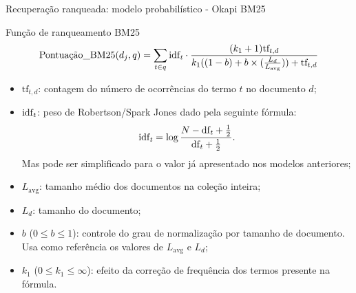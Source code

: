 \documentclass[%
  10pt,%
  aspectratio = 169,%
  compress,%
  t,%
]{beamer}%
\begin{document}
    \begin{frame}[fragile = singleslide]{}{Recuperação ranqueada: modelo probabilístico - Okapi BM25}
        \begin{block}{Função de ranqueamento BM25}
            \begin{equation}
                \label{eq:okapi-bm25}
        		\text{Pontuação\_BM25}(d_j, q) = \sum_{t \in q} \text{idf}_{\text{\textit{t}}}
        		\cdot
        		\frac{(k_1 + 1) \text{tf}_{t,d}}{k_1((1-b)+b \times (\frac{L_d}{L_{\text{avg}}})) + \text{tf}_{t,d}}
            \end{equation}
        \end{block}
        \begin{itemize}
            \item $\text{tf}_{t,d}$: contagem do número de ocorrências do termo $t$ no documento $d$;

            \item $\text{idf}_{\text{\textit{t}}}$: peso de Robertson/Spark Jones dado pela seguinte fórmula:
            \begin{equation}
                \label{eq:peso-rsj-adaptado}
        		\text{idf}_{\text{\textit{t}}} = \log{\frac{N-\text{df}_{\text{\textit{t}}}+\frac{1}{2}}{\text{df}_{\text{\textit{t}}} + \frac{1}{2} }}.
            \end{equation}
            Mas pode ser simplificado para o valor já apresentado nos modelos anteriores;

            \item $L_{\text{avg}}$: tamanho médio dos documentos na coleção inteira;

            \item $L_d$: tamanho do documento;

            \item $b$ ($0 \leq b \leq 1$): controle do grau de normalização por tamanho de documento. Usa como referência os valores de $L_{\text{avg}}$ e $L_d$;

            \item $k_1$ ($0 \leq k_1 \leq \infty$): efeito da correção de frequência dos termos presente na fórmula.
        \end{itemize}
    \end{frame}
\end{document}
